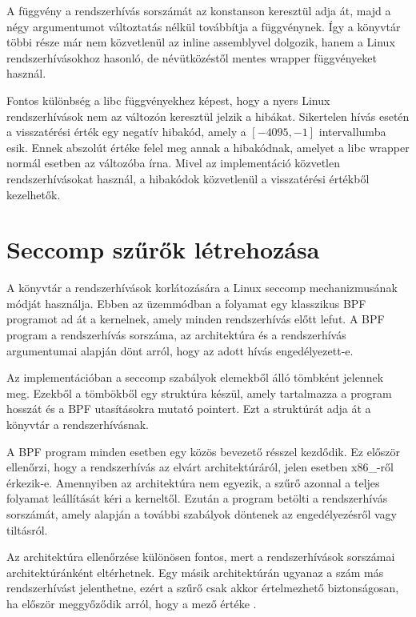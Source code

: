 A  függvény a rendszerhívás sorszámát az
 konstanson keresztül adja át, majd a négy
argumentumot változtatás nélkül továbbítja a 
függvénynek. Így a könyvtár többi része már nem közvetlenül az inline assemblyvel
dolgozik, hanem a Linux rendszerhívásokhoz hasonló, de névütközéstől mentes
wrapper függvényeket használ.

Fontos különbség a libc függvényekhez képest, hogy a nyers Linux
rendszerhívások nem az  változón keresztül jelzik a hibákat.
Sikertelen hívás esetén a visszatérési érték egy negatív hibakód, amely
a $[-4095, -1]$ intervallumba esik. Ennek abszolút értéke felel meg
annak a hibakódnak, amelyet a libc wrapper normál esetben az 
változóba írna. Mivel az implementáció közvetlen rendszerhívásokat használ, a
hibakódok közvetlenül a visszatérési értékből kezelhetők.

\section{Seccomp szűrők létrehozása}

A könyvtár a rendszerhívások korlátozására a Linux seccomp
mechanizmusának 
módját használja. Ebben az
üzemmódban a folyamat egy klasszikus BPF programot ad át a kernelnek, amely
minden rendszerhívás előtt lefut. A BPF program a rendszerhívás sorszáma, az
architektúra és a rendszerhívás argumentumai alapján dönt arról, hogy az adott
hívás engedélyezett-e.

Az implementációban a seccomp szabályok  elemekből álló
tömbként jelennek meg. Ezekből a tömbökből egy  struktúra
készül, amely tartalmazza a program hosszát és a BPF utasításokra mutató
pointert. Ezt a struktúrát adja át a könyvtár a 
rendszerhívásnak.

A BPF program minden esetben egy közös bevezető résszel kezdődik. Ez először
ellenőrzi, hogy a rendszerhívás az elvárt architektúráról, jelen esetben
x86\_-ről érkezik-e. Amennyiben az architektúra nem egyezik, a
szűrő azonnal a teljes folyamat leállítását kéri a kerneltől. Ezután a program
betölti a rendszerhívás sorszámát, amely alapján a további szabályok
döntenek az engedélyezésről vagy tiltásról.

Az architektúra ellenőrzése különösen fontos, mert a rendszerhívások sorszámai
architektúránként eltérhetnek. Egy másik architektúrán ugyanaz a szám más
rendszerhívást jelenthetne, ezért a szűrő csak akkor értelmezhető biztonságosan,
ha először meggyőződik arról, hogy a  mező értéke
.

